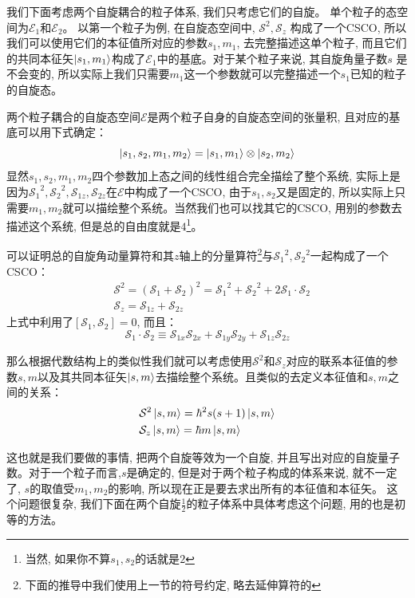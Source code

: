 \documentclass[a4paper,zihao=-4,linespread=1]{ctexrep}
\begin{document}
    我们下面考虑两个自旋耦合的粒子体系, 我们只考虑它们的自旋。 单个粒子的态空间为$\mathscr{E}_1$和$\mathscr{E}_2$。 以第一个粒子为例, 在自旋态空间中, $\mathcal{S}^2, \mathcal{S}_z$
    构成了一个CSCO, 所以我们可以使用它们的本征值所对应的参数$s_1,m_1$, 去完整描述这单个粒子, 而且它们的共同本征矢$\ket{s_1,m_1}$构成了$\mathscr{E}_1$中的基底。对于某个粒子来说, 其自旋角量子数$s$
    是不会变的, 所以实际上我们只需要$m_1$这一个参数就可以完整描述一个$s_1$已知的粒子的自旋态。
    
    两个粒子耦合的自旋态空间$\mathscr{E}$是两个粒子自身的自旋态空间的张量积, 且对应的基底可以用下式确定：
    \[\ket{s_1,s_2,m_1,m_2}=\ket{s_1,m_1}\otimes\ket{s_2,m_2}\]
    显然$s_1,s_2,m_1,m_2$四个参数加上态之间的线性组合完全描绘了整个系统, 实际上是因为${\mathcal{S}_1}^2,{\mathcal{S}_2}^2,{\mathcal{S}_{1z}},{\mathcal{S}_{2z}}$在$\mathscr{E}$中构成了一个CSCO,
    由于$s_1,s_2$又是固定的, 所以实际上只需要$m_1,m_2$就可以描绘整个系统。当然我们也可以找其它的CSCO, 用别的参数去描述这个系统, 但是总的自由度就是$4$\footnote{当然, 如果你不算$s_1,s_2$的话就是$2$}。

    可以证明总的自旋角动量算符和其$z$轴上的分量算符\footnote{下面的推导中我们使用上一节的符号约定, 略去延伸算符的$\tilde{}$}与${\mathcal{S}_1}^2,{\mathcal{S}_2}^2$一起构成了一个CSCO：
    \begin{align}
        &\mathcal{S}^2=\left(\mathcal{S}_1+\mathcal{S}_2\right)^2={\mathcal{S}_1}^2+{\mathcal{S}_2}^2+2\mathcal{S}_1\cdot\mathcal{S}_2\\
        &\mathcal{S}_z=\mathcal{S}_{1z}+\mathcal{S}_{2z}
    \end{align}
    上式中利用了$\left[\mathcal{S}_1,\mathcal{S}_2\right]=0$, 而且：
    \[\mathcal{S}_1\cdot\mathcal{S}_2\equiv\mathcal{S}_{1x}\mathcal{S}_{2x}+\mathcal{S}_{1y}\mathcal{S}_{2y}+\mathcal{S}_{1z}\mathcal{S}_{2z}\]
    
    那么根据代数结构上的类似性我们就可以考虑使用$\mathcal{S}^2$和$\mathcal{S}_z$对应的联系本征值的参数$s,m$以及其共同本征矢$\ket{s,m}$去描绘整个系统。且类似的去定义本征值和$s,m$之间的关系：
    \begin{align}
        &\mathcal{S}^2\ket{s,m}=\hbar^2s(s+1)\ket{s,m}\\
        &\mathcal{S}_z\ket{s,m}=\hbar m\ket{s,m}    
    \end{align}
    
    这也就是我们要做的事情, 把两个自旋等效为一个自旋, 并且写出对应的自旋量子数。对于一个粒子而言,$s$是确定的, 但是对于两个粒子构成的体系来说, 就不一定了, $s$的取值受$m_1,m_2$的影响, 所以现在正是要去求出所有的本征值和本征矢。
    这个问题很复杂, 我们下面在两个自旋$\frac{1}{2}$的粒子体系中具体考虑这个问题, 用的也是初等的方法。
\end{document}
